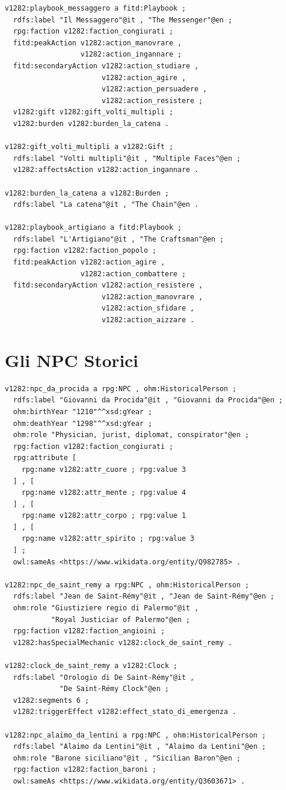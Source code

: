 \begin{verbatim}
v1282:playbook_messaggero a fitd:Playbook ;
  rdfs:label "Il Messaggero"@it , "The Messenger"@en ;
  rpg:faction v1282:faction_congiurati ;
  fitd:peakAction v1282:action_manovrare ,
                  v1282:action_ingannare ;
  fitd:secondaryAction v1282:action_studiare ,
                       v1282:action_agire ,
                       v1282:action_persuadere ,
                       v1282:action_resistere ;
  v1282:gift v1282:gift_volti_multipli ;
  v1282:burden v1282:burden_la_catena .

v1282:gift_volti_multipli a v1282:Gift ;
  rdfs:label "Volti multipli"@it , "Multiple Faces"@en ;
  v1282:affectsAction v1282:action_ingannare .

v1282:burden_la_catena a v1282:Burden ;
  rdfs:label "La catena"@it , "The Chain"@en .

v1282:playbook_artigiano a fitd:Playbook ;
  rdfs:label "L'Artigiano"@it , "The Craftsman"@en ;
  rpg:faction v1282:faction_popolo ;
  fitd:peakAction v1282:action_agire ,
                  v1282:action_combattere ;
  fitd:secondaryAction v1282:action_resistere ,
                       v1282:action_manovrare ,
                       v1282:action_sfidare ,
                       v1282:action_aizzare .
\end{verbatim}

\section{Gli NPC Storici}

\begin{verbatim}
v1282:npc_da_procida a rpg:NPC , ohm:HistoricalPerson ;
  rdfs:label "Giovanni da Procida"@it , "Giovanni da Procida"@en ;
  ohm:birthYear "1210"^^xsd:gYear ;
  ohm:deathYear "1298"^^xsd:gYear ;
  ohm:role "Physician, jurist, diplomat, conspirator"@en ;
  rpg:faction v1282:faction_congiurati ;
  rpg:attribute [
    rpg:name v1282:attr_cuore ; rpg:value 3
  ] , [
    rpg:name v1282:attr_mente ; rpg:value 4
  ] , [
    rpg:name v1282:attr_corpo ; rpg:value 1
  ] , [
    rpg:name v1282:attr_spirito ; rpg:value 3
  ] ;
  owl:sameAs <https://www.wikidata.org/entity/Q982785> .

v1282:npc_de_saint_remy a rpg:NPC , ohm:HistoricalPerson ;
  rdfs:label "Jean de Saint-Rémy"@it , "Jean de Saint-Rémy"@en ;
  ohm:role "Giustiziere regio di Palermo"@it ,
           "Royal Justiciar of Palermo"@en ;
  rpg:faction v1282:faction_angioini ;
  v1282:hasSpecialMechanic v1282:clock_de_saint_remy .

v1282:clock_de_saint_remy a v1282:Clock ;
  rdfs:label "Orologio di De Saint-Rémy"@it ,
             "De Saint-Rémy Clock"@en ;
  v1282:segments 6 ;
  v1282:triggerEffect v1282:effect_stato_di_emergenza .

v1282:npc_alaimo_da_lentini a rpg:NPC , ohm:HistoricalPerson ;
  rdfs:label "Alaimo da Lentini"@it , "Alaimo da Lentini"@en ;
  ohm:role "Barone siciliano"@it , "Sicilian Baron"@en ;
  rpg:faction v1282:faction_baroni ;
  owl:sameAs <https://www.wikidata.org/entity/Q3603671> .
\end{verbatim}

